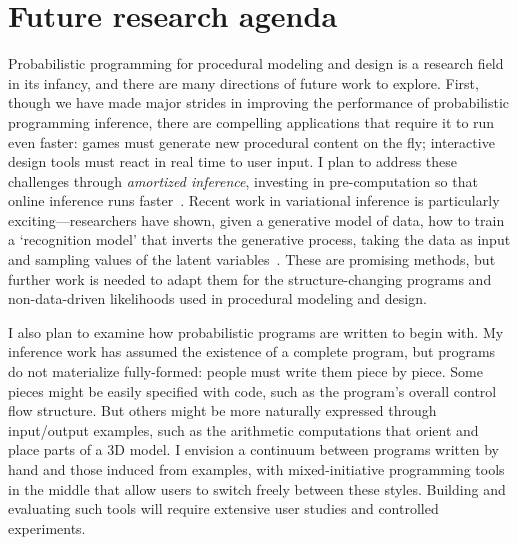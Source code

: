 \documentclass[
10pt, %
a4paper, %
oneside, %
headinclude,footinclude, %
BCOR5mm, %
]{scrartcl}
\begin{document}





\section*{Future research agenda}

Probabilistic programming for procedural modeling and design is a research field in its infancy, and there are many directions of future work to explore. First, though we have made major strides in improving the performance of probabilistic programming inference, there are compelling applications that require it to run even faster: games must generate new procedural content on the fly; interactive design tools must react in real time to user input. I plan to address these challenges through \emph{amortized inference}, investing in pre-computation so that online inference runs faster~\cite{AmortizedInference}. Recent work in variational inference is particularly exciting---researchers have shown, given a generative model of data, how to train a `recognition model' that inverts the generative process, taking the data as input and sampling values of the latent variables~\cite{StochasticBackprop}. These are promising methods, but further work is needed to adapt them for the structure-changing programs and non-data-driven likelihoods used in procedural modeling and design.

I also plan to examine how probabilistic programs are written to begin with. My inference work has assumed the existence of a complete program, but programs do not materialize fully-formed: people must write them piece by piece. Some pieces might be easily specified with code, such as the program's overall control flow structure. But others might be more naturally expressed through input/output examples, such as the arithmetic computations that orient and place parts of a 3D model. I envision a continuum between programs written by hand and those induced from examples, with mixed-initiative programming tools in the middle that allow users to switch freely between these styles. Building and evaluating such tools will require extensive user studies and controlled experiments.
\end{document}

